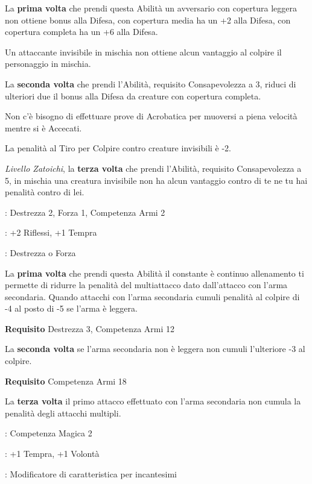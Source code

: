 \begin{multicols}{2}
La \textbf{prima volta} che prendi questa Abilità un avversario con copertura leggera non ottiene bonus alla Difesa, con copertura media ha un +2 alla Difesa, con copertura completa ha un +6 alla Difesa.

Un attaccante invisibile in mischia non ottiene alcun vantaggio al colpire il personaggio in mischia.

La \textbf{seconda volta} che prendi l'Abilità, requisito Consapevolezza a 3, riduci di ulteriori due il bonus alla Difesa da creature con copertura completa.

Non c'è bisogno di effettuare prove di Acrobatica per muoversi a piena velocità mentre si è Accecati.

La penalità al Tiro per Colpire contro creature invisibili è -2.

\emph{Livello Zatoichi}, la \textbf{terza volta} che prendi l'Abilità, requisito Consapevolezza a 5, in mischia una creatura invisibile non ha alcun vantaggio contro di te ne tu hai penalità contro di lei.

\begin{description}[noitemsep, topsep=0pt, parsep=0pt, partopsep=0pt, leftmargin=0cm, labelwidth=2.5cm]
    \item[\textbf{Requisito}]: Destrezza 2, Forza 1, Competenza Armi 2
    \item[\textbf{Tiri Salvezza}]: +2 Riflessi, +1 Tempra
    \item[\textbf{Caratteristica}]: Destrezza o Forza
\end{description}

La \textbf{prima volta} che prendi questa Abilità il constante è continuo allenamento ti permette di ridurre la penalità del multiattacco dato dall'attacco con l'arma secondaria. Quando attacchi con l'arma secondaria cumuli penalità al colpire di -4 al posto di -5 se l'arma è leggera.

\textbf{Requisito} Destrezza 3, Competenza Armi 12

La \textbf{seconda volta} se l'arma secondaria non è leggera non cumuli l'ulteriore -3 al colpire.

\textbf{Requisito} Competenza Armi 18

La \textbf{terza volta} il primo attacco effettuato con l'arma secondaria non cumula la penalità degli attacchi multipli.

\begin{description}[noitemsep, topsep=0pt, parsep=0pt, partopsep=0pt, leftmargin=0cm, labelwidth=2.5cm]
    \item[\textbf{Requisito}]: Competenza Magica 2
    \item[\textbf{Tiri Salvezza}]: +1 Tempra, +1 Volontà
    \item[\textbf{Caratteristica}]: Modificatore di caratteristica per incantesimi
\end{description}


\end{multicols}
